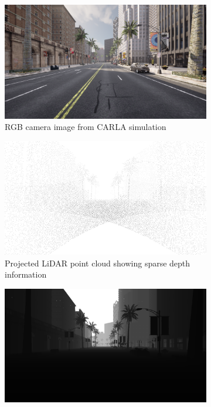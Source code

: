 \begin{figure}[h]
    \centering
    \begin{subfigure}{\textwidth}
        \centering
        \includegraphics[width=\textwidth, trim=0 200pt 0 200pt, clip]{figures/rgb.png}
        \caption{RGB camera image from CARLA simulation}
        \label{fig:rgb_input}
    \end{subfigure}
    \begin{subfigure}{\textwidth}
        \centering
        \includegraphics[width=\textwidth, trim=0 200pt 0 200pt, clip]{figures/point_cloud.png}
        \caption{Projected LiDAR point cloud showing sparse depth information}
        \label{fig:pointcloud_input}
    \end{subfigure}
    \begin{subfigure}{\textwidth}
        \centering
        \includegraphics[width=\textwidth, trim=0 200pt 0 200pt, clip]{figures/depth_gt.png}

\end{subfigure}
\end{figure}
